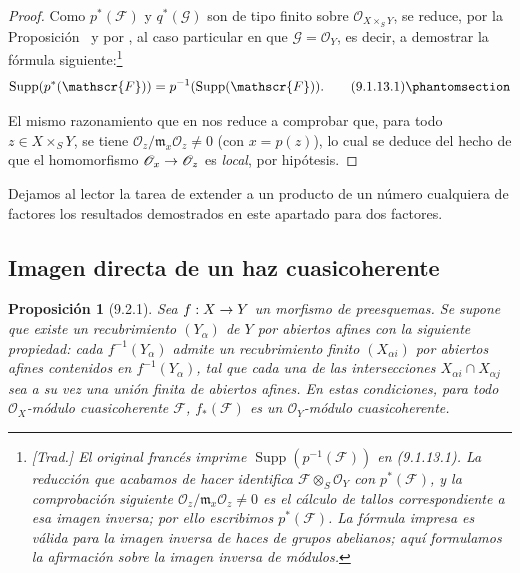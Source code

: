\documentclass[oneside]{amsart}
\theoremstyle{ega-env-style}
\theoremstyle{ega-thm-env-style}
\newtheorem*{proposition}{Proposición}
\theoremstyle{ega-defn-env-style}
\def\mathcal{\mathscr}
\def\sh{\mathcal}                   %
\def\Supp{\operatorname{Supp}}
\renewcommand{\to}{\mathchoice{\longrightarrow}{\rightarrow}{\rightarrow}{\rightarrow}}
\let\EGAOriginalLabel\label
\renewcommand{\label}[1]{\phantomsection\EGAOriginalLabel{#1}}
\begin{document}
\begin{proof}
Como $p^*(\mathscr{F})$ y $q^*(\mathscr{G})$ son de tipo finito sobre
$\mathscr{O}_{X\times_S Y}$, se reduce, por la Proposición~ y
por , al caso particular en que $\mathscr{G}=\mathscr{O}_Y$, es
decir, a demostrar la fórmula siguiente:\footnote{\emph{[Trad.] El
original francés imprime $\Supp(p^{-1}(\sh{F}))$ en (9.1.13.1). La reducción
que acabamos de hacer identifica $\sh{F}\otimes_S\sh{O}_Y$ con $p^*(\sh{F})$, y la
comprobación siguiente $\sh{O}_z/\mathfrak{m}_x\sh{O}_z\neq0$ es el cálculo
de tallos correspondiente a esa imagen inversa; por ello escribimos $p^*(\sh{F})$.
La fórmula impresa es válida para la imagen inversa de haces de grupos abelianos; aquí formulamos la afirmación sobre la imagen inversa de módulos.}}
\[
  \operatorname{Supp}(p^*(\mathscr{F}))
  =p^{-1}(\operatorname{Supp}(\mathscr{F})).
  \tag{9.1.13.1}\label{I.9.1.13.1-fr}
\]

El mismo razonamiento que en  nos reduce a comprobar que, para todo
$z\in X\times_S Y$, se tiene $\mathscr{O}_z/\mathfrak{m}_x\mathscr{O}_z\neq0$ (con $x=p(z)$),
lo cual se deduce del hecho de que el homomorfismo $\mathscr{O}_x\to\mathscr{O}_z$ es \emph{local},
por hipótesis.
\end{proof}

Dejamos al lector la tarea de extender a un producto de un número cualquiera
de factores los resultados demostrados en este apartado para dos factores.

\subsection{Imagen directa de un haz cuasicoherente}
\label{subsection:I.9.2}

\begin{proposition}[9.2.1]
\label{I.9.2.1}
Sea $f:X\to Y$ un morfismo de preesquemas. Se supone que existe un
recubrimiento $(Y_\alpha)$ de $Y$ por abiertos afines con la siguiente
propiedad: cada $f^{-1}(Y_\alpha)$ admite un recubrimiento
\emph{finito} $(X_{\alpha i})$ por abiertos afines contenidos en
$f^{-1}(Y_\alpha)$, tal que cada una de las intersecciones
$X_{\alpha i}\cap X_{\alpha j}$ sea a su vez una unión \emph{finita} de
abiertos afines. En estas condiciones, para todo $\mathscr{O}_X$-módulo
cuasicoherente $\mathscr{F}$, $f_*(\mathscr{F})$ es un $\mathscr{O}_Y$-módulo
cuasicoherente.
\end{proposition}
\end{document}
